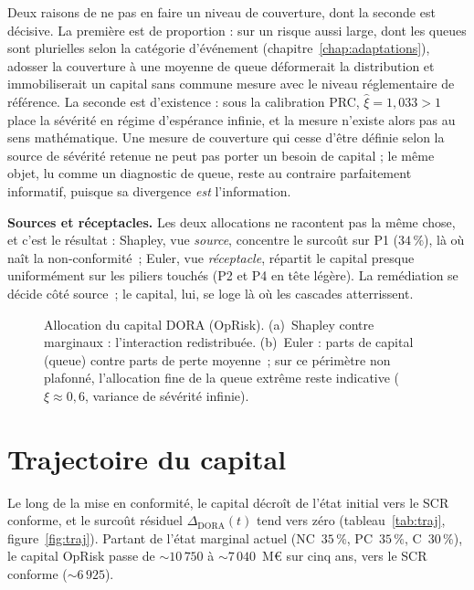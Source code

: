 Deux raisons de ne pas en faire un niveau de couverture, dont la seconde est décisive. La
première est de proportion : sur un risque aussi large, dont les queues sont plurielles selon la
catégorie d'événement (chapitre~\ref{chap:adaptations}), adosser la couverture à une moyenne de queue
déformerait la distribution et immobiliserait un capital sans commune mesure avec le niveau
réglementaire de référence. La seconde est d'existence : sous la calibration PRC,
$\hat\xi=1{,}033>1$ place la sévérité en régime d'espérance infinie, et la mesure
n'existe alors pas au sens mathématique. Une mesure de couverture qui cesse d'être définie
selon la source de sévérité retenue ne peut pas porter un besoin de capital ; le même objet,
lu comme un diagnostic de queue, reste au contraire parfaitement informatif, puisque sa
divergence \emph{est} l'information.

\begin{cle}
\textbf{Sources et réceptacles.} Les deux allocations ne racontent pas la même chose, et
c'est le résultat : Shapley, vue \emph{source}, concentre le surcoût sur P1 ($34\,\%$), là
où naît la non-conformité~; Euler, vue \emph{réceptacle}, répartit le capital presque
uniformément sur les piliers touchés (P2 et P4 en tête légère). La remédiation se décide
côté source~; le capital, lui, se loge là où les cascades atterrissent.
\end{cle}

\begin{figure}[htbp]\centering
{}
\caption{Allocation du capital DORA (OpRisk). (a)~Shapley contre marginaux : l'interaction
redistribuée. (b)~Euler : parts de capital (queue) contre parts de perte moyenne~; sur ce
périmètre non plafonné, l'allocation fine de la queue extrême reste indicative
($\xi \approx 0{,}6$, variance de sévérité infinie).}
\label{fig:allocation}
\end{figure}

\section{Trajectoire du capital}
\label{sec:res-traj}

Le long de la mise en conformité, le capital décroît de l'état initial vers le SCR conforme, et
le surcoût résiduel $\Delta_{\text{DORA}}(t)$ tend vers zéro (tableau~\ref{tab:traj},
figure~\ref{fig:traj}). Partant de l'état marginal actuel (NC~$35\,\%$, PC~$35\,\%$, C~$30\,\%$),
le capital OpRisk passe de $\sim 10\,750$ à $\sim 7\,040$~M\euro{} sur cinq ans, vers le SCR
conforme ($\sim 6\,925$).

